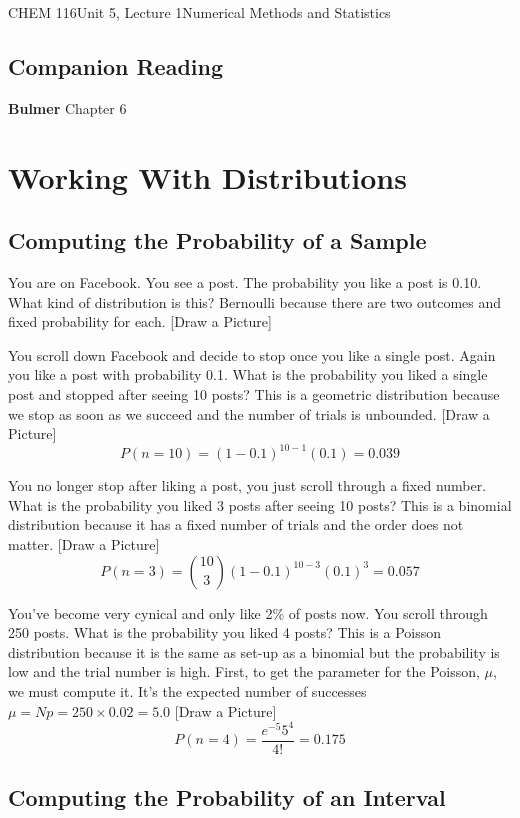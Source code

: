 \documentclass{article}
\begin{document}
\begin{tdoc}{CHEM 116}{Unit 5, Lecture 1}{Numerical Methods and Statistics}

  \subsection*{Companion Reading}
  \textbf{Bulmer} Chapter 6

\section{Working With Distributions}

\subsection{Computing the Probability of a Sample}

You are on Facebook. You see a post. The probability you like a post
is 0.10. What kind of distribution is this? Bernoulli because there
are two outcomes and fixed probability for each. [Draw a Picture]

You scroll down Facebook and decide to stop once you like a single
post. Again you like a post with probability 0.1. What is the
probability you liked a single post and stopped after seeing 10
posts? This is a geometric distribution because we stop as soon as we
succeed and the number of trials is unbounded. [Draw a Picture]
\[
P(n=10) = (1 - 0.1)^{10 - 1}(0.1) = 0.039
\]

You no longer stop after liking a post, you just scroll through a
fixed number. What is the probability you liked 3 posts after seeing
10 posts? This is a binomial distribution because it has a fixed
number of trials and the order does not matter. [Draw a Picture]
\[
P(n=3) = {10 \choose 3} (1 - 0.1)^{10 -3 }(0.1)^{3} = 0.057
\]

You've become very cynical and only like 2\% of posts now. You scroll
through 250 posts. What is the probability you liked 4 posts? This is
a Poisson distribution because it is the same as set-up as a binomial
but the probability is low and the trial number is high. First, to
get the parameter for the Poisson, $\mu$, we must compute it. It's
the expected number of successes $\mu = Np = 250 \times 0.02 = 5.0$
[Draw a Picture]
\[
P(n=4) = \frac{e^{-5}5^4}{4!} = 0.175
\]

 \subsection{Computing the Probability of an Interval}


\end{tdoc}
\end{document}
